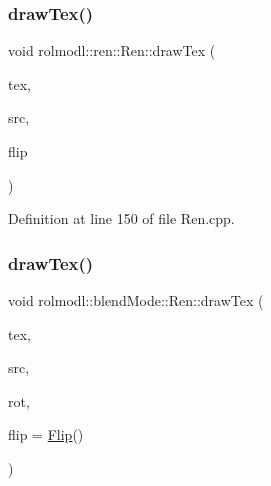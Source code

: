 \subsubsection{\texorpdfstring{drawTex()}{drawTex()}\hspace{0.1cm}{\footnotesize\ttfamily [14/36]}}
{\footnotesize\ttfamily void rolmodl\+::ren\+::\+Ren\+::draw\+Tex (\begin{DoxyParamCaption}\item[{Tex \&}]{tex,  }\item[{const \mbox{\hyperlink{structrolmodl_1_1blend_mode_1_1_src_rect_x_y}{Src\+Rect\+XY}}}]{src,  }\item[{const \mbox{\hyperlink{structrolmodl_1_1blend_mode_1_1_flip}{Flip}}}]{flip }\end{DoxyParamCaption})}



Definition at line 150 of file Ren.\+cpp.

\mbox{\label{classrolmodl_1_1blend_mode_1_1_ren_aca7bffd9cca6886d1573538e85e37f8e}} 
\subsubsection{\texorpdfstring{drawTex()}{drawTex()}\hspace{0.1cm}{\footnotesize\ttfamily [15/36]}}
{\footnotesize\ttfamily void rolmodl\+::blend\+Mode\+::\+Ren\+::draw\+Tex (\begin{DoxyParamCaption}\item[{Tex \&}]{tex,  }\item[{const \mbox{\hyperlink{structrolmodl_1_1blend_mode_1_1_src_rect_w_h}{Src\+Rect\+WH}}}]{src,  }\item[{const double}]{rot,  }\item[{const \mbox{\hyperlink{structrolmodl_1_1blend_mode_1_1_flip}{Flip}}}]{flip = {\ttfamily \mbox{\hyperlink{structrolmodl_1_1blend_mode_1_1_flip}{Flip}}()} }\end{DoxyParamCaption})}

\mbox{\label{classrolmodl_1_1blend_mode_1_1_ren_aec65d9d229a68839254ca46c1159c5da}} 
